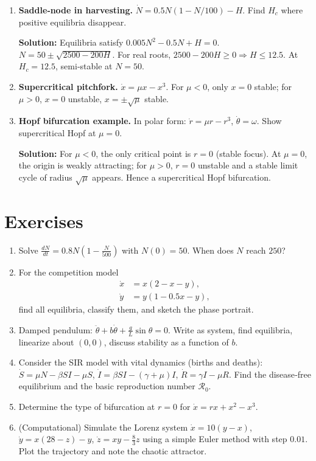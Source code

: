 \documentclass[12pt,a4paper]{book}
\begin{document}
\begin{enumerate}[leftmargin=*, label=\textbf{Example 3.\arabic*}]
    \item \textbf{Saddle‑node in harvesting.}
    $\dot{N} = 0.5 N(1 - N/100) - H$. Find $H_c$ where positive equilibria disappear.

    \textbf{Solution:} Equilibria satisfy $0.005 N^2 - 0.5 N + H = 0$. $N = 50 \pm \sqrt{2500 - 200 H}$.
    For real roots, $2500 - 200H \ge 0 \Rightarrow H \le 12.5$. At $H_c=12.5$, semi‑stable at $N=50$.

    \item \textbf{Supercritical pitchfork.}
    $\dot{x} = \mu x - x^3$. For $\mu<0$, only $x=0$ stable; for $\mu>0$, $x=0$ unstable, $x=\pm\sqrt{\mu}$ stable.

    \item \textbf{Hopf bifurcation example.}
    In polar form: $\dot{r} = \mu r - r^3$, $\dot{\theta} = \omega$. Show supercritical Hopf at $\mu=0$.

    \textbf{Solution:} For $\mu<0$, the only critical point is $r=0$ (stable focus). At $\mu=0$, the origin is weakly attracting; for $\mu>0$, $r=0$ unstable and a stable limit cycle of radius $\sqrt{\mu}$ appears. Hence a supercritical Hopf bifurcation.
\end{enumerate}

\section{Exercises}
\begin{enumerate}[leftmargin=*, label=\textbf{Exercise 3.\arabic*}]
    \item Solve $\frac{dN}{dt} = 0.8 N \left(1 - \frac{N}{500}\right)$ with $N(0)=50$. When does $N$ reach $250$?
    \item For the competition model
    \begin{align*}
    \dot{x} &= x(2 - x - y),\\
    \dot{y} &= y(1 - 0.5 x - y),
    \end{align*}
    find all equilibria, classify them, and sketch the phase portrait.
    \item Damped pendulum: $\ddot{\theta} + b \dot{\theta} + \frac{g}{L} \sin\theta = 0$. Write as system, find equilibria, linearize about $(0,0)$, discuss stability as a function of $b$.
    \item Consider the SIR model with vital dynamics (births and deaths): $\dot{S} = \mu N - \beta S I - \mu S$, $\dot{I} = \beta S I - (\gamma + \mu) I$, $\dot{R} = \gamma I - \mu R$. Find the disease‑free equilibrium and the basic reproduction number $\mathcal{R}_0$.
    \item Determine the type of bifurcation at $r=0$ for $\dot{x} = r x + x^2 - x^3$.
    \item (Computational) Simulate the Lorenz system $\dot{x} = 10(y-x)$, $\dot{y} = x(28-z)-y$, $\dot{z} = xy - \tfrac{8}{3}z$ using a simple Euler method with step $0.01$. Plot the trajectory and note the chaotic attractor.
\end{enumerate}
\end{document}
